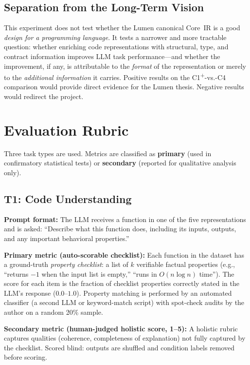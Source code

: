 \documentclass[11pt]{article}
\begin{document}
\subsection*{Separation from the Long-Term Vision}

This experiment does not test whether the Lumen canonical Core~IR is a
good \emph{design for a programming language}.  It tests a narrower
and more tractable question: whether enriching code representations
with structural, type, and contract information improves LLM task
performance---and whether the improvement, if any, is attributable to
the \emph{format} of the representation or merely to the
\emph{additional information} it carries.  Positive results on the
C1\textsuperscript{+}-vs.-C4 comparison would provide direct evidence
for the Lumen thesis.  Negative results would redirect the project.


\section{Evaluation Rubric}
\label{sec:rubric}

Three task types are used.  Metrics are classified as
\textbf{primary} (used in confirmatory statistical tests) or
\textbf{secondary} (reported for qualitative analysis only).

\subsection*{T1: Code Understanding}

\textbf{Prompt format:}  The LLM receives a function in one of the
five representations and is asked: ``Describe what this function does,
including its inputs, outputs, and any important behavioral
properties.''

\textbf{Primary metric (auto-scorable checklist):}  Each function in
the dataset has a ground-truth \emph{property checklist}: a list of
$k$ verifiable factual properties (e.g., ``returns $-1$ when the input
list is empty,'' ``runs in $O(n \log n)$ time'').  The score for each
item is the fraction of checklist properties correctly stated in the
LLM's response ($0.0$--$1.0$).  Property matching is performed by an
automated classifier (a second LLM or keyword-match script) with
spot-check audits by the author on a random 20\% sample.

\textbf{Secondary metric (human-judged holistic score, 1--5):}
A holistic rubric captures qualities (coherence, completeness of
explanation) not fully captured by the checklist.  Scored blind:
outputs are shuffled and condition labels removed before scoring.
\end{document}
